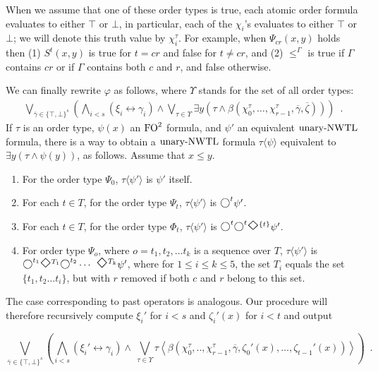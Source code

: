 \documentclass{LMCS}
\newcommand{\next}{\text{\raisebox{1pt}{$\bigcirc$}}}
\newcommand{\FO}{{\rm FO}}
\renewcommand{\phi}{\varphi}
\theoremstyle{plain}
\theoremstyle{definition}
\newcommand{\false}{\bot}
\newcommand{\true}{\top}
\newcommand{\ucaret}{\text{unary-}\caret}
\renewcommand{\ucaret}{\text{unary-}\nwtl}
\newcommand{\utl}{\ucaret}
\newcommand{\fotwo}{\FO^2}
\newcommand{\eventually}{\text{\Large $\Diamond$}}
\newcommand{\caret}{\text{CaRet}}
\newcounter{example}
\begin{document}
When we assume that one of these order types is true,
each atomic order formula evaluates to either $\true$ or $\false$, in
particular, each of the $\chi_i$'s evaluates to either $\true$ or
$\false$; we will denote this truth value by $\chi_i^\tau$. 
For example, when $\Psi_{cr}(x,y)$ holds then
(1) $S^t(x,y)$ is true for $t=cr$ and false for $t\not=cr$, and
(2) $\le^\Gamma$ is true if $\Gamma$ contains $cr$ or if $\Gamma$ contains both $c$ and $r$,
and false otherwise.

We can
finally rewrite $\phi$ as follows, where $\Upsilon$ stands for the
set of all order types:
\begin{eqnarray*}
  \bigvee_{\overline{\gamma} \in \{\true, \false\}^s} (
  \bigwedge_{i<s} (\xi_i \leftrightarrow \gamma_i) \wedge
  \bigvee_{\tau \in \Upsilon} \exists y (\tau \wedge
  \beta(\chi_0^\tau, \dots, \chi_{r-1}^\tau, \overline{\gamma},
  \overline{\zeta}))) \enspace.
\end{eqnarray*}
If $\tau$ is an order type, $\psi(x)$ an
$\fotwo$ formula, and $\psi'$ an equivalent $\utl$ formula, there is
a way to obtain a $\utl$ formula $\tau\langle\psi\rangle$
equivalent to $\exists y (\tau \wedge \psi(y))$, as follows.
Assume that $x \leq y$.
\begin{enumerate}[$\bullet$]
\item
For the order type $\Psi_0$, $\tau\langle\psi'\rangle$ is $\psi'$ itself.
\item For each $t\in T$,  
for the order type $\Psi_t$, $\tau\langle\psi'\rangle$ is $\next^t\psi'$.
\item For each $t\in T$,  
for the order type $\Phi_t$, $\tau\langle\psi'\rangle$ is $\next^t\next^t\eventually^{\{t\}}\psi'$.
\item 
For order type $\Psi_o$, where $o=t_1,t_2,\ldots t_k$  is a sequence over $T$, 
$\tau\langle\psi'\rangle$ is 
$\next^{t_1}\eventually^{T_1}\next^{t_2}\cdots$ $\eventually^{T_k}\psi'$,
where for $1\le i\le k\le 5$, the set $T_i$ equals the set $\{t_1,t_2\ldots t_i\}$,
but with $r$ removed if both $c$ and $r$ belong to this set.
\end{enumerate}
The case corresponding to past operators is analogous.
Our procedure will therefore recursively compute $\xi_i'$ for $i<s$
and $\zeta_i'(x)$ for $i<t$ and output

\begin{equation}
\bigvee_{\overline{\gamma} \in \{\true,
  \false\}^s} \!\!\!\! ( \bigwedge_{i<s} (\xi_i' \leftrightarrow
  \gamma_i) \wedge \ \bigvee_{\tau \in \Upsilon} 
\tau\left\langle\beta(\chi_0^\tau, ..,
      \chi_{r-1}^\tau, \overline{\gamma}, \zeta_0'(x), \dots,
      \zeta_{t-1}'(x)) \right\rangle ) \enspace.
\label{eq:translation}
\end{equation}
\end{document}
